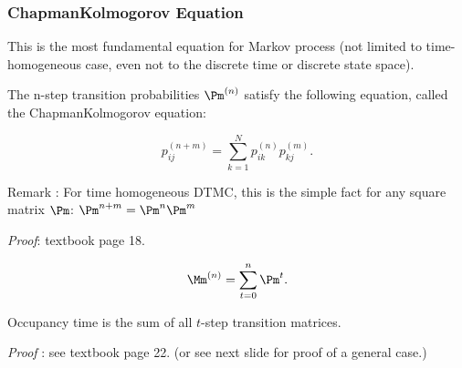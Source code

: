 \documentclass[english,10pt]{beamer}
\begin{document}
\begin{frame}
\frametitle{Chapman\textendash{}Kolmogorov Equation}

This is the most fundamental equation for Markov process (not limited to time-homogeneous case,
even not to the discrete time or discrete state space).

\bigskip 
\begin{theorem}[Thm 2.3]
The n-step transition probabilities $\Pm^{(n)}$ satisfy the following equation,
called the Chapman\textendash{}Kolmogorov equation:

\[
p_{ij}^{(n+m)}=\sum_{k=1}^{N}p_{ik}^{(n)}p_{kj}^{(m)}.
\]
\end{theorem}%

Remark :  For time homogeneous DTMC, this is the simple fact for any square matrix $\Pm$:
$\Pm^{n+m}=\Pm^{n}\Pm^{m}$

{\it Proof}: textbook page 18.
\end{frame}



\frame
{
\begin{theorem}[Thm 2.4]
\[ \Mm^{(n)} = \sum_{t=0}^n \Pm^t.\]
\end{theorem}
Occupancy time is the sum of all $t$-step transition matrices.

\medskip
{\it Proof} : see textbook page 22.
(or see next slide for proof of a general case.)

}
\end{document}
